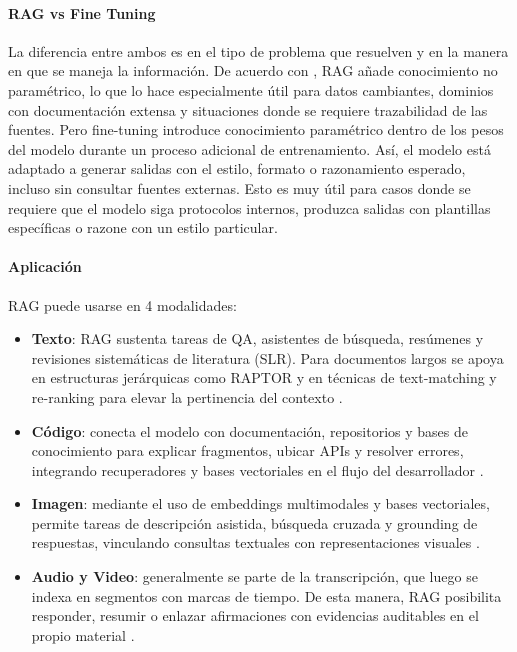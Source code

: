\paragraph{RAG vs Fine Tuning}  
La diferencia entre ambos es en el tipo de problema que resuelven y en la manera en que se maneja la información. De acuerdo con \textcite{gao2023rag}, RAG añade conocimiento no paramétrico, lo que lo hace especialmente útil para datos cambiantes, dominios con documentación extensa y situaciones donde se requiere trazabilidad de las fuentes. Pero fine-tuning introduce conocimiento paramétrico dentro de los pesos del modelo durante un proceso adicional de entrenamiento. Así, el modelo está adaptado a generar salidas con el estilo, formato o razonamiento esperado, incluso sin consultar fuentes externas. Esto es muy útil para casos donde se requiere que el modelo siga protocolos internos, produzca salidas con plantillas específicas o razone con un estilo particular.

\paragraph{Aplicación}  
RAG puede usarse en 4 modalidades:

\begin{itemize}
    \item \textbf{Texto}: RAG sustenta tareas de QA, asistentes de búsqueda, resúmenes y revisiones sistemáticas de literatura (SLR). Para documentos largos se apoya en estructuras jerárquicas como RAPTOR y en técnicas de text-matching y re-ranking para elevar la pertinencia del contexto \parencite{gao2023rag,han2024rag,jiang2024textmatching,sarthi2024raptor}.  
    
    \item \textbf{Código}: conecta el modelo con documentación, repositorios y bases de conocimiento para explicar fragmentos, ubicar APIs y resolver errores, integrando recuperadores y bases vectoriales en el flujo del desarrollador \parencite{hu2024ragrau}.  
    
    \item \textbf{Imagen}: mediante el uso de embeddings multimodales y bases vectoriales, permite tareas de descripción asistida, búsqueda cruzada y grounding de respuestas, vinculando consultas textuales con representaciones visuales \parencite{jing2024vecdb,ma2025vector}.  
    
    \item \textbf{Audio y Video}: generalmente se parte de la transcripción, que luego se indexa en segmentos con marcas de tiempo. De esta manera, RAG posibilita responder, resumir o enlazar afirmaciones con evidencias auditables en el propio material \parencite{jing2024vecdb,zhao2024rag}.  
\end{itemize}




